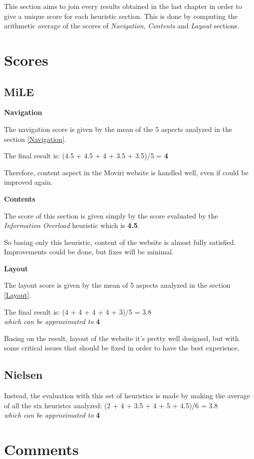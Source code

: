 This section aims to join every results obtained in the last chapter in order to give a unique score for each heuristic section. This is done by computing the arithmetic average of the scores of \textit{Navigation}, \textit{Contents} and \textit{Layout} sections.\par
\bigskip
\section{Scores}
\subsection{MiLE}
\textbf{Navigation}\par
The navigation score is given by the mean of the 5 aspects analyzed in the section \ref{Navigation}. \par 
The final result is: 
(4.5 + 4.5 + 4 + 3.5 + 3.5)/5 = \textbf{4}\par
Therefore, content aspect in the Moviri website is handled well, even if could be improved again.
\par\medskip

\textbf{Contents}\par
The score of this section is given simply by the score evaluated by the \textit{Information Overload} heuristic which is \textbf{4.5}. \par
So basing only this heuristic, content of the website is almost fully satisfied. Improvements could be done, but fixes will be minimal.
\par\medskip

\textbf{Layout}\par
The layout score is given by the mean of 5 aspects analyzed in the section \ref{Layout}. \par
The final result is: 
(4 + 4 + 4 + 4 + 3)/5 = 3.8 \\
\textit{which can be approximated to} \textbf{4}\par
Basing on the result, layout of the website it's pretty well designed, but with some critical issues that should be fixed in order to have the best experience.

\subsection{Nielsen}
Instead, the evaluation with this set of heuristics is made by making the average of all the six heuristcs analyzed:
(2 + 4 + 3.5 + 4 + 5 + 4.5)/6 = 3.8 \\
\textit{which can be approximated to} \textbf{4}\par

\section{Comments}
